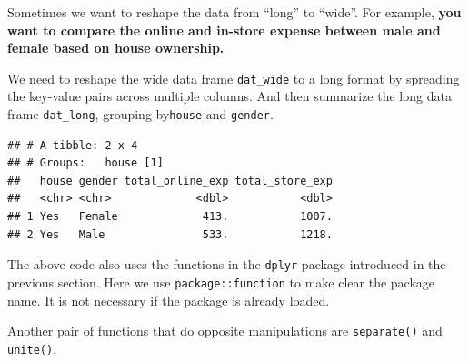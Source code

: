 \documentclass[12pt,]{krantz}
\makeatletter
\newenvironment{Shaded}{\begin{snugshade}}{\end{snugshade}}
\newcommand{\CommentTok}[1]{\textcolor[rgb]{0.37,0.37,0.37}{\textit{#1}}}
\newcommand{\DataTypeTok}[1]{\textcolor[rgb]{0.27,0.27,0.27}{#1}}
\newcommand{\KeywordTok}[1]{\textcolor[rgb]{0.27,0.27,0.27}{\textbf{#1}}}
\newcommand{\NormalTok}[1]{#1}
\newcommand{\OperatorTok}[1]{\textcolor[rgb]{0.43,0.43,0.43}{\textbf{#1}}}
\newcommand{\StringTok}[1]{\textcolor[rgb]{0.5,0.5,0.5}{#1}}
\newenvironment{kframe}{%
\medskip{}
\setlength{\fboxsep}{.8em}
 \def\at@end@of@kframe{}%
 \ifinner\ifhmode%
  \def\at@end@of@kframe{\end{minipage}}%
  \begin{minipage}{\columnwidth}%
 \fi\fi%
 \def\FrameCommand##1{\hskip\@totalleftmargin \hskip-\fboxsep
 \colorbox{shadecolor}{##1}\hskip-\fboxsep
     \hskip-\linewidth \hskip-\@totalleftmargin \hskip\columnwidth}%
 \MakeFramed {\advance\hsize-\width
   \@totalleftmargin\z@ \linewidth\hsize
   \@setminipage}}%
 {\par\unskip\endMakeFramed%
 \at@end@of@kframe}
\renewenvironment{Shaded}{\begin{kframe}}{\end{kframe}}
\makeatother
\begin{document}
Sometimes we want to reshape the data from ``long'' to ``wide''. For example, \textbf{you want to compare the online and in-store expense between male and female based on house ownership.}

We need to reshape the wide data frame \texttt{dat\_wide} to a long format by spreading the key-value pairs across multiple columns. And then summarize the long data frame \texttt{dat\_long}, grouping by\texttt{house} and \texttt{gender}.

\begin{Shaded}
\end{Shaded}

\begin{verbatim}
## # A tibble: 2 x 4
## # Groups:   house [1]
##   house gender total_online_exp total_store_exp
##   <chr> <chr>             <dbl>           <dbl>
## 1 Yes   Female             413.           1007.
## 2 Yes   Male               533.           1218.
\end{verbatim}

The above code also uses the functions in the \texttt{dplyr} package introduced in the previous section. Here we use \texttt{package::function} to make clear the package name. It is not necessary if the package is already loaded.

Another pair of functions that do opposite manipulations are \texttt{separate()} and \texttt{unite()}.

\begin{Shaded}
\end{Shaded}
\end{document}
